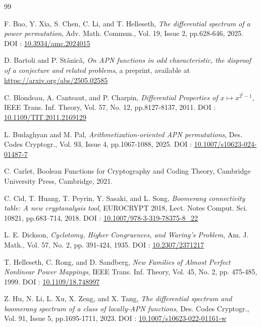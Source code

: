 \documentclass[11pt]{article}
\numberwithin{theorem}{section}
\begin{document}
\begin{thebibliography}{99}

 F. Bao, Y. Xia, S. Chen, C. Li, and T. Helleseth, \emph{The differential spectrum of a power permutation}, Adv. Math. Commun., Vol. 19, Issue 2, pp.628-646, 2025. DOI : \href{https://doi.org/10.3934/amc.2024015}{10.3934/amc.2024015}

 D. Bartoli and P. St\v{a}nic\v{a}, \emph{On APN functions in odd characteristic, the disproof of a conjecture and related problems}, a preprint, available at \href{https://arxiv.org/abs/2505.02585} {https://arxiv.org/abs/2505.02585}

 C. Blondeau, A. Canteaut, and P. Charpin,  \emph{Differential Properties of $x \mapsto x^{2^t -1}$}, IEEE Trans. Inf. Theory, Vol. 57, No. 12, pp.8127-8137, 2011.
DOI : \href{https://doi.org/10.1109/TIT.2011.2169129}{10.1109/TIT.2011.2169129}

 L. Budaghyan and M. Pal, \emph{Arithmetization-oriented APN permutations}, Des. Codes Cryptogr., Vol. 93, Issue 4, pp.1067-1088, 2025.
DOI : \href{https://doi.org/10.1007/s10623-024-01487-7}{10.1007/s10623-024-01487-7}


 C. Carlet, Boolean Functions for Cryptography and Coding Theory, Cambridge University Press, Cambridge, 2021.

 C. Cid, T. Huang,  T. Peyrin, Y. Sasaki, and L. Song,  \emph{Boomerang connectivity table: A new cryptanalysis tool}, EUROCRYPT 2018, Lect. Notes Comput. Sci. 10821, pp.683–714, 2018. 
DOI : \href{https://doi.org/10.1007/978-3-319-78375-8_22}{10.1007/978-3-319-78375-8\_22}

 L. E. Dickson, \emph{Cyclotomy, Higher Congruences, and Waring's Problem}, Am. J. Math., Vol. 57, No. 2, pp. 391-424, 1935. 
DOI : \href{https://doi.org/10.2307/2371217}{10.2307/2371217}



 T. Helleseth, C. Rong, and D. Sandberg, \emph{New Families of Almost Perfect Nonlinear Power Mappings}, IEEE Trans. Inf. Theory, Vol. 45, No. 2, pp. 475-485, 1999.
DOI : \href{https://doi.org/10.1109/18.748997}{10.1109/18.748997}

 Z. Hu, N. Li, L. Xu, X. Zeng, and X. Tang, \emph{The differential spectrum and boomerang spectrum of a class of locally-APN functions}, Des. Codes Cryptogr., Vol. 91, Issue 5, pp.1695-1711, 2023.
DOI : \href{https://doi.org/10.1007/s10623-022-01161-w}{10.1007/s10623-022-01161-w}


\end{thebibliography}
\end{document}

